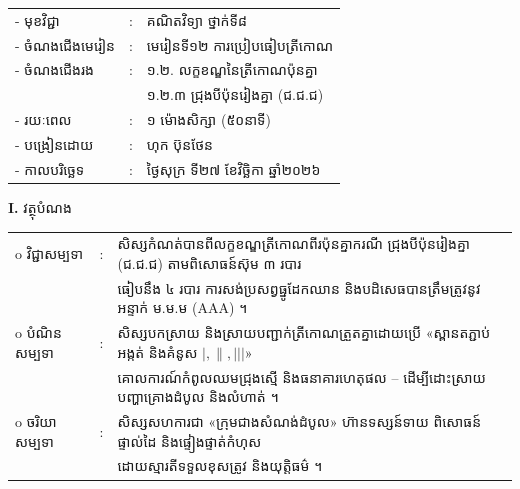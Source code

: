 \documentclass[a4paper,10pt]{article}
\newcommand{\wcirc}{{\CourierBullet\fontsize{9.5pt}{11pt}\selectfont o}}
\newcommand{\cnum}[1]{{\fontsize{10.5pt}{12pt}\selectfont\ding{\numexpr181+#1\relax}}\hspace{0.2em}}
\begin{document}
{\renewcommand{\arraystretch}{0.92}
\hspace*{4.6cm}%
\begin{tabular}{@{}l l l@{}}
  - \hspace{0.35cm} មុខវិជ្ជា & : & គណិតវិទ្យា ថ្នាក់ទី៨ \\
  - \hspace{0.35cm} ចំណងជើងមេរៀន & : & មេរៀនទី១២ ការប្រៀបធៀបត្រីកោណ \\
  - \hspace{0.35cm} ចំណងជើងរង & : & ១.២. លក្ខខណ្ឌនៃត្រីកោណប៉ុនគ្នា \\
  & & ១.២.៣ ជ្រុងបីប៉ុនរៀងគ្នា (ជ.ជ.ជ) \\
  - \hspace{0.35cm} រយៈពេល & : & ១ ម៉ោងសិក្សា (៥០នាទី) \\
  - \hspace{0.35cm} បង្រៀនដោយ & : & ហុក ប៊ុនថែន \\
  - \hspace{0.35cm} កាលបរិច្ឆេទ & : & ថ្ងៃសុក្រ ទី២៧ ខែវិច្ឆិកា ឆ្នាំ២០២៦ \\
\end{tabular}

\vspace{0pt}

\textbf{I.} {\muol វត្ថុបំណង}\\[1pt]
\hspace*{0.55cm}%
\begin{tabular}{@{}l l l@{}}
  \wcirc \hspace{0.25cm} វិជ្ជាសម្បទា & : & សិស្សកំណត់បានពីលក្ខខណ្ឌត្រីកោណពីរប៉ុនគ្នាករណី ជ្រុងបីប៉ុនរៀងគ្នា (ជ.ជ.ជ) តាមពិសោធន៍ស៊ុម ៣ របារ \\
  & & ធៀបនឹង ៤ របារ ការសង់ប្រសព្វធ្នូដែកឈាន និងបដិសេធបានត្រឹមត្រូវនូវអន្ទាក់ ម.ម.ម (AAA) ។ \\
  \wcirc \hspace{0.25cm} បំណិនសម្បទា & : & សិស្សបកស្រាយ និងស្រាយបញ្ជាក់ត្រីកោណត្រួតគ្នាដោយប្រើ «ស្ពានតភ្ជាប់អង្កត់ និងគំនូស $|, \parallel, |||$» \\
  & & គោលការណ៍កំពូលឈមជ្រុងស្មើ និងធនាគារហេតុផល \cnum{1}--\cnum{5} ដើម្បីដោះស្រាយបញ្ហាគ្រោងដំបូល និងលំហាត់ ។ \\
  \wcirc \hspace{0.25cm} ចរិយាសម្បទា & : & សិស្សសហការជា «ក្រុមជាងសំណង់ដំបូល» ហ៊ានទស្សន៍ទាយ ពិសោធន៍ផ្ទាល់ដៃ និងផ្ទៀងផ្ទាត់កំហុស \\
  & & ដោយស្មារតីទទួលខុសត្រូវ និងយុត្តិធម៌ ។ \\
\end{tabular}

}
\end{document}
